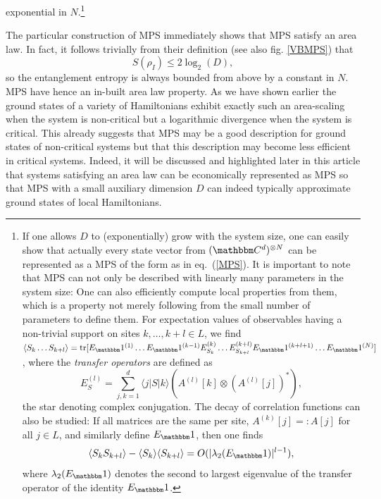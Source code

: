 \documentclass[rmp,twocolumn,floatfix,epsfig,graphics]{revtex4} %
\begin{document}
exponential in $N$.\footnote{If one allows $D$ to 
(exponentially) grow with the system size, one can easily show 
that actually every state vector from $(\cc^{d})^{\otimes N}$ 
can be represented as a MPS of the form as in eq.\ (\ref{MPS}). 
It is important to note that MPS can not only be described with 
linearly many parameters in the system size: One can also 
efficiently compute local properties from them, which is a property 
not merely following from the small number of parameters 
to define them. For expectation values of
 observables having a non-trivial support on sites $k,\dots, k+l\in L$,
 we find
 $ \langle S_k \dots S_{k+l}\rangle = \text{tr}[E_\id^{(1)}\dots E_\id^{(k-1)}
         E_{S_{k}}^{(k)}\dots E_{S_{k+l}}^{(k+l)} E_\id^{(k+l+1)}\dots E_\id^{(N)}]$,
 where the {\it transfer operators} are defined as
 \begin{equation*}
         E_S^{(l)}= \sum_{j,k=1}^d \langle j|S|k\rangle 
         \left( A^{(l)}[k]\otimes  (A^{(l)}[j])^\ast \right),
 \end{equation*}
 the star denoting complex conjugation.
The decay of correlation functions can also be studied:
If all matrices are the same per site, $A^{(k)}[j]=:A[j]$
 for all $j\in L$, and similarly define
 $E_\id$, then one finds
 \begin{equation*}
 	\langle S_k S_{k+l}\rangle - \langle S_k \rangle  \langle S_{k+l}\rangle  =
         O(  |\lambda_2(E_\id) |^{l-1}),
  \end{equation*}        
where $\lambda_2(E_\id)$ denotes the second to largest eigenvalue of
 the transfer operator of the identity $E_\id$.
}

The particular construction of MPS immediately shows
that MPS satisfy an area law. In fact, it follows trivially 
from their definition (see also fig. \ref{VBMPS}) that
\begin{equation*}
        S(\rho_I) \leq 2 \log_2 (D), 
\end{equation*}
so the entanglement entropy is always bounded from above by 
a constant in $N$. MPS have hence an in-built area law property. 
As we have shown earlier the ground states of a variety of 
Hamiltonians exhibit exactly such an area-scaling when the 
system is non-critical but a logarithmic divergence when the
system is critical. This already suggests that MPS may be
a good description for ground states of non-critical systems but
that this description may become less efficient in critical systems.
Indeed, it will be discussed and highlighted later in this
article that systems satisfying an area law can be economically 
represented as MPS so that MPS with a small auxiliary 
dimension $D$ can indeed typically approximate 
ground states of local Hamiltonians. 
\end{document}
